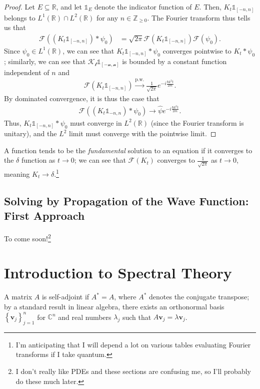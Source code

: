 \documentclass[10pt]{extarticle}
\newcommand{\Z}{\mathbb{Z}}
\newcommand{\R}{\mathbb{R}}
\newcommand{\C}{\mathbb{C}}
\newcommand{\set}[1]{\left\{#1\right\}}
\theoremstyle{plain}
\theoremstyle{definition}
\theoremstyle{remark}
\renewcommand{\newline}{\hfill\break}
\begin{document}
  \begin{proof}
    Let $E\subseteq \R$, and let $\mathbb{1}_E$ denote the indicator function of $E$. Then, $K_t \mathbb{1}_{[-n,n]}$ belongs to $L^{1}(\R) \cap L^{2}(\R)$ for any $n \in \Z_{\geq 0}$. The Fourier transform thus tells us that
    \begin{align*}
      \mathcal{F}\left(\left(K_t \mathbb{1}_{[-n,n]}\right)\ast \psi_0\right) &= \sqrt{2\pi}\mathcal{F}\left(K_t \mathbb{1}_{[-n,n]}\right) \mathcal{F}\left(\psi_0\right).
    \end{align*}
    Since $\psi_0 \in L^{1}(\R)$, we can see that $K_t \mathbb{1}_{[-n,n]}\ast \psi_0$ converges pointwise to $K_t\ast \psi_0$; similarly, we can see that $\mathcal{K_t \mathbb{1}_{[-n,n]}}$ is bounded by a constant function independent of $n$ and
    \begin{align*}
      \mathcal{F}\left(K_t \mathbb{1}_{[-n,n]}\right) \xrightarrow{\text{p.w.}} \frac{1}{\sqrt{2\pi}}e^{-i\frac{\hbar k^2t}{2m}}.
    \end{align*}
    By dominated convergence, it is thus the case that
    \begin{align*}
      \mathcal{F}\left(\left(K_t \mathbb{1}_{-n,n}\right)\ast \psi_0\right) \rightarrow \hat{\psi}e^{-i\frac{\hbar k^2t}{2m}}.
    \end{align*}
    Thus, $K_t\mathbb{1}_{[-n,n]}\ast \psi_0$ must converge in $L^2(\R)$ (since the Fourier transform is unitary), and the $L^2$ limit must converge with the pointwise limit.
  \end{proof}
  A function tends to be the \textit{fundamental} solution to an equation if it converges to the $\delta$ function as $t\rightarrow 0$; we can see that $\mathcal{F}\left(K_t\right)$ converges to $\frac{1}{\sqrt{2\pi}}$ as $t\rightarrow 0$, meaning $K_t \rightarrow \delta$.\footnote{I'm anticipating that I will depend a lot on various tables evaluating Fourier transforms if I take quantum.}
  \subsection{Solving by Propagation of the Wave Function: First Approach}%
  To come soon!\footnote{I don't really like PDEs and these sections are confusing me, so I'll probably do these much later.}
  \section{Introduction to Spectral Theory}%
  A matrix $A$ is self-adjoint if $A^{\ast} = A$, where $A^{\ast}$ denotes the conjugate transpose; by a standard result in linear algebra, there exists an orthonormal basis $\set{\mathbf{v}_j}_{j=1}^{n}$ for $\C^n$ and real numbers $\lambda_j$ such that $A\mathbf{v}_j = \lambda \mathbf{v}_j$.\newline
\end{document}
